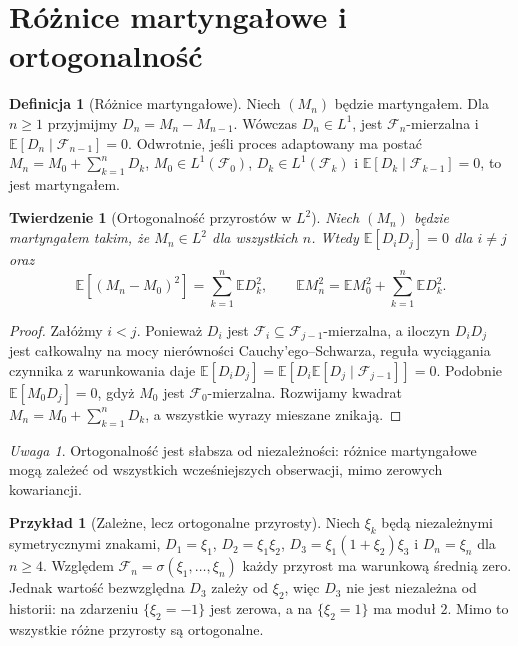 \documentclass[11pt,a4paper,oneside]{report}
\numberwithin{equation}{chapter}
\theoremstyle{plain}
\newtheorem{twierdzenie}{Twierdzenie}[chapter]
\theoremstyle{definition}
\newtheorem{definicja}{Definicja}[chapter]
\newtheorem{przyklad}{Przykład}[chapter]
\theoremstyle{remark}
\newtheorem{uwaga}{Uwaga}[chapter]
\newcommand{\E}{\mathbb{E}}
\begin{document}
\section{Różnice martyngałowe i ortogonalność}

\begin{definicja}[Różnice martyngałowe]
Niech $(M_n)$ będzie martyngałem. Dla $n\geq1$
przyjmijmy $D_n=M_n-M_{n-1}$.
Wówczas $D_n\in L^1$, jest $\mathcal F_n$-mierzalna
i $\E[D_n\mid\mathcal F_{n-1}]=0$.
Odwrotnie, jeśli proces adaptowany ma postać
$M_n=M_0+\sum_{k=1}^nD_k$,
$M_0\in L^1(\mathcal F_0)$,
$D_k\in L^1(\mathcal F_k)$ i
$\E[D_k\mid\mathcal F_{k-1}]=0$, to jest martyngałem.
\end{definicja}

\begin{twierdzenie}[Ortogonalność przyrostów w $L^2$]
Niech $(M_n)$ będzie martyngałem takim, że
$M_n\in L^2$ dla wszystkich $n$. Wtedy
$\E[D_iD_j]=0$ dla $i\ne j$ oraz
\[
\E[(M_n-M_0)^2]=\sum_{k=1}^n\E D_k^2,
\qquad
\E M_n^2=\E M_0^2+\sum_{k=1}^n\E D_k^2.
\]
\end{twierdzenie}
\begin{proof}
Załóżmy $i<j$. Ponieważ $D_i$ jest
$\mathcal F_i\subseteq\mathcal F_{j-1}$-mierzalna,
a iloczyn $D_iD_j$ jest całkowalny na mocy
nierówności Cauchy'ego--Schwarza, reguła
wyciągania czynnika z warunkowania daje
$\E[D_iD_j]=\E[D_i\E[D_j\mid\mathcal F_{j-1}]]=0$.
Podobnie
$\E[M_0D_j]=0$, gdyż $M_0$ jest
$\mathcal F_0$-mierzalna. Rozwijamy kwadrat
$M_n=M_0+\sum_{k=1}^nD_k$, a wszystkie
wyrazy mieszane znikają.
\end{proof}

\begin{uwaga}
Ortogonalność jest słabsza od niezależności:
różnice martyngałowe mogą zależeć od wszystkich
wcześniejszych obserwacji, mimo zerowych kowariancji.
\end{uwaga}

\begin{przyklad}[Zależne, lecz ortogonalne przyrosty]
Niech $\xi_k$ będą niezależnymi symetrycznymi
znakami, $D_1=\xi_1$, $D_2=\xi_1\xi_2$,
$D_3=\xi_1(1+\xi_2)\xi_3$ i
$D_n=\xi_n$ dla $n\geq4$.
Względem $\mathcal F_n=\sigma(\xi_1,\ldots,\xi_n)$
każdy przyrost ma warunkową średnią zero.
Jednak wartość bezwzględna $D_3$ zależy od
$\xi_2$, więc $D_3$ nie jest niezależna od
historii: na zdarzeniu $\{\xi_2=-1\}$ jest zerowa,
a na $\{\xi_2=1\}$ ma moduł $2$.
Mimo to wszystkie różne przyrosty są ortogonalne.
\end{przyklad}
\end{document}
